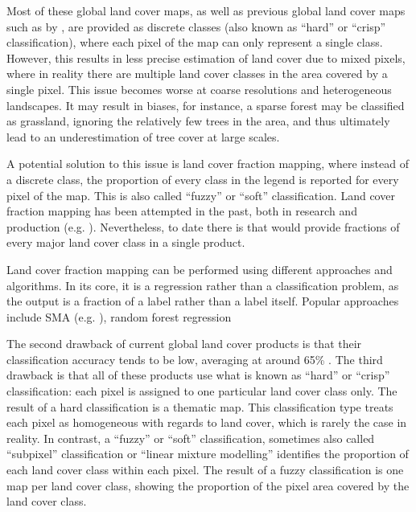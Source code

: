 \documentclass[a4paper,10pt]{article}
\begin{document}
Most of these global land cover maps, as well as previous global land cover maps such as by \citet{bartholome2005glc2000, friedl2010modis, arino2007globcover, see2015hybrid, chen2015globeland30}, are provided as discrete classes (also known as ``hard'' or ``crisp'' classification), where each pixel of the map can only represent a single class.
However, this results in less precise estimation of land cover due to mixed pixels, where in reality there are multiple land cover classes in the area covered by a single pixel.
This issue becomes worse at coarse resolutions and heterogeneous landscapes.
It may result in biases, for instance, a sparse forest may be classified as grassland, ignoring the relatively few trees in the area, and thus ultimately lead to an underestimation of tree cover at large scales.

A potential solution to this issue is land cover fraction mapping, where instead of a discrete class, the proportion of every class in the legend is reported for every pixel of the map.
This is also called ``fuzzy'' or ``soft'' classification.
Land cover fraction mapping has been attempted in the past, both in research \citep{adams_classification_1995, foody1996fuzzyevaluation, colditz_land_2011, sharma_assessing_2011, uma_shankar_wavelet-fuzzy_2011, dwivedi_optimisation_2012, lizarazo_quantitative_2012, gessner_estimating_2013, okujeni_generalizing_2018} and production (e.g. \citealp{hansen2000hardtree, hansen_continuous_2011, pengra_global_2015, hansen_global_2003, sexton_global_2013}).
Nevertheless, to date there is  that would provide fractions of every major land cover class in a single product.

Land cover fraction mapping can be performed using different approaches and algorithms.
In its core, it is a regression rather than a classification problem, as the output is a fraction of a label rather than a label itself. Popular approaches include \ac{SMA} (e.g. \citealp{yang_landsat_2012, hobbs2003linear, shimabukuro1991least}), random forest regression

The second drawback of current global land cover products is that their classification accuracy tends to be low, averaging at around 65\% \citep{tsendbazar2016integrating}. The third drawback is that all of these products use what is known as ``hard'' or ``crisp'' classification: each pixel is assigned to one particular land cover class only. The result of a hard classification is a thematic map. This classification type treats each pixel as homogeneous with regards to land cover, which is rarely the case in reality. In contrast, a ``fuzzy'' or ``soft'' classification, sometimes also called ``subpixel'' classification or ``linear mixture modelling'' \citep{Okeke2006fuzzyexponent} identifies the proportion of each land cover class within each pixel. The result of a fuzzy classification is one map per land cover class, showing the proportion of the pixel area covered by the land cover class.
\end{document}
